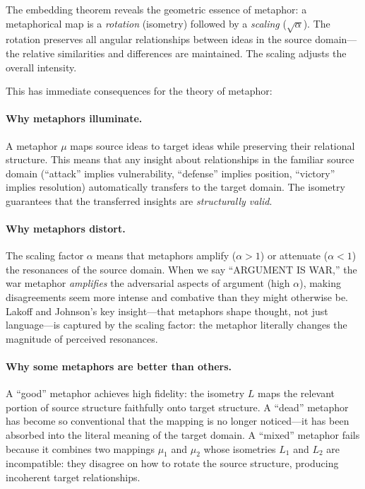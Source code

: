 \begin{interpretation}
\label{interp:metaphor-geometry}
The embedding theorem reveals the geometric essence of metaphor: a metaphorical
map is a \emph{rotation} (isometry) followed by a \emph{scaling}
($\sqrt{\alpha}$).  The rotation preserves all angular relationships between
ideas in the source domain---the relative similarities and differences are
maintained.  The scaling adjusts the overall intensity.

This has immediate consequences for the theory of metaphor:

\paragraph{Why metaphors illuminate.} A metaphor $\mu$ maps source ideas to
target ideas while preserving their relational structure.  This means that
any insight about relationships in the familiar source domain (``attack''
implies vulnerability, ``defense'' implies position, ``victory'' implies
resolution) automatically transfers to the target domain.  The isometry
guarantees that the transferred insights are \emph{structurally valid}.

\paragraph{Why metaphors distort.} The scaling factor $\alpha$ means that
metaphors amplify ($\alpha > 1$) or attenuate ($\alpha < 1$) the resonances
of the source domain.  When we say ``ARGUMENT IS WAR,'' the war metaphor
\emph{amplifies} the adversarial aspects of argument (high $\alpha$), making
disagreements seem more intense and combative than they might otherwise be.
Lakoff and Johnson's key insight---that metaphors shape thought, not just
language---is captured by the scaling factor: the metaphor literally changes
the magnitude of perceived resonances.

\paragraph{Why some metaphors are better than others.} A ``good'' metaphor
achieves high fidelity: the isometry $L$ maps the relevant portion of source
structure faithfully onto target structure.  A ``dead'' metaphor has become
so conventional that the mapping is no longer noticed---it has been absorbed
into the literal meaning of the target domain.  A ``mixed'' metaphor fails
because it combines two mappings $\mu_1$ and $\mu_2$ whose isometries $L_1$
and $L_2$ are incompatible: they disagree on how to rotate the source structure,
producing incoherent target relationships.
\end{interpretation}

